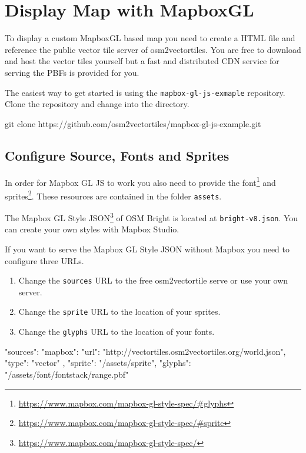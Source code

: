 \section*{Display Map with MapboxGL}\label{display-map-with-mapboxgl}

To display a custom MapboxGL based map you need to create a HTML file
and reference the public vector tile server of osm2vectortiles. You are
free to download and host the vector tiles yourself but a
fast and distributed CDN service for serving the PBFs is provided for you.

The easiest way to get started is using the
\texttt{mapbox-gl-js-exmaple} repository. Clone the repository and
change into the directory.

\begin{bashcode}
git clone https://github.com/osm2vectortiles/mapbox-gl-js-example.git
\end{bashcode}

\subsection*{Configure Source, Fonts and
Sprites}\label{configure-source-fonts-and-sprites}

In order for Mapbox GL JS to work you also need to provide the
font\footnote{\url{https://www.mapbox.com/mapbox-gl-style-spec/\#glyphs}} and
sprites\footnote{\url{https://www.mapbox.com/mapbox-gl-style-spec/\#sprite}}.
These resources are contained in the folder \texttt{assets}.

The Mapbox GL Style JSON\footnote{\url{https://www.mapbox.com/mapbox-gl-style-spec/}} of OSM Bright is located at \texttt{bright-v8.json}. You can
create your own styles with Mapbox Studio.

If you want to serve the Mapbox GL Style JSON without Mapbox you need to
configure three URLs.

\begin{enumerate}
\item
  Change the \texttt{sources} URL to the free osm2vectortile serve or use your own server.
\item
  Change the \texttt{sprite} URL to the location of your sprites.
\item
  Change the \texttt{glyphs} URL to the location of your fonts.
\end{enumerate}

\begin{javascriptcode}
"sources": {
    "mapbox": {
        "url": "http://vectortiles.osm2vectortiles.org/world.json",
        "type": "vector"
    }
},
"sprite": "/assets/sprite",
"glyphs": "/assets/font/{fontstack}/{range}.pbf"
\end{javascriptcode}

